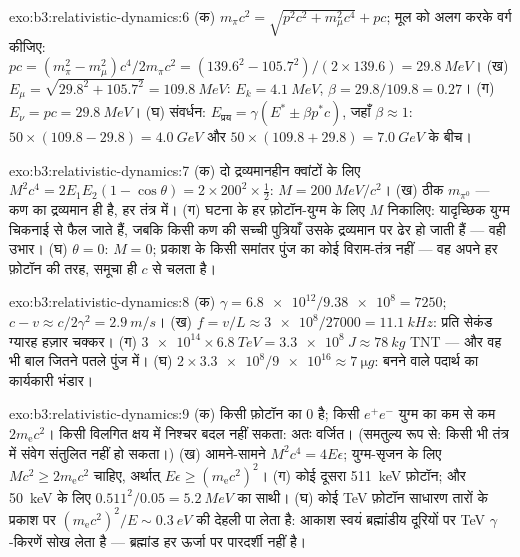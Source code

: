 \begin{solution}{exo:b3:relativistic-dynamics:6}
(क) $m_\pi c^2 = \sqrt{p^2c^2 + m_\mu^2c^4} + pc$; मूल को अलग करके
वर्ग कीजिए: $pc = (m_\pi^2 - m_\mu^2)c^4/2m_\pi c^2 =
(139.6^2 - 105.7^2)/(2 \times 139.6) = \qty{29.8}{MeV}$। (ख) $E_\mu =
\sqrt{29.8^2 + 105.7^2} = \qty{109.8}{MeV}$: $E_k = \qty{4.1}{MeV}$,
$\beta = 29.8/109.8 = 0.27$। (ग) $E_\nu = pc = \qty{29.8}{MeV}$। (घ)
संवर्धन: $E_{\text{प्रय}} = \gamma(E^* \pm \beta p^*c)$, जहाँ $\beta
\approx 1$: $50 \times (109.8 - 29.8) = \qty{4.0}{GeV}$ और
$50 \times (109.8 + 29.8) = \qty{7.0}{GeV}$ के बीच।
\end{solution}

\begin{solution}{exo:b3:relativistic-dynamics:7}
(क) दो द्रव्यमानहीन क्वांटों के लिए $M^2c^4 = 2E_1E_2(1 - \cos\theta) =
2 \times 200^2 \times \tfrac12$: $M = \qty{200}{MeV}/c^2$। (ख)
ठीक $m_{\pi^0}$ ---  कण का द्रव्यमान ही है, हर
तंत्र में। (ग) घटना के हर फ़ोटॉन-युग्म के लिए $M$ निकालिए:
यादृच्छिक युग्म चिकनाई से फैल जाते हैं, जबकि किसी कण की सच्ची पुत्रियाँ
उसके द्रव्यमान पर ढेर हो जाती हैं --- वही उभार। (घ) $\theta = 0$: $M = 0$;
प्रकाश के किसी समांतर पुंज का कोई विराम-तंत्र नहीं --- वह अपने हर
फ़ोटॉन की तरह, समूचा ही $c$ से चलता है।
\end{solution}

\begin{solution}{exo:b3:relativistic-dynamics:8}
(क) $\gamma = \num{6.8e12}/\num{9.38e8} = 7250$; $c - v \approx
c/2\gamma^2 = \qty{2.9}{m/s}$। (ख) $f = v/L \approx \num{3e8}/27000 =
\qty{11.1}{kHz}$: प्रति सेकंड ग्यारह हज़ार चक्कर। (ग) $\num{3e14}
\times \qty{6.8}{TeV} = \qty{3.3e8}{J} \approx \qty{78}{kg}$ TNT
--- और वह भी बाल जितने पतले पुंज में। (घ) $2 \times \num{3.3e8}/\num{9e16} \approx
\qty{7}{\micro g}$: बनने वाले पदार्थ का कार्यकारी भंडार।
\end{solution}

\begin{solution}{exo:b3:relativistic-dynamics:9}
(क) किसी फ़ोटॉन का  $0$ है; किसी $e^+e^-$ युग्म का कम
से कम $2m_{\text{e}}c^2$। किसी विलगित क्षय में निश्चर बदल नहीं सकता:
अतः वर्जित। (समतुल्य रूप से: किसी भी तंत्र में संवेग संतुलित नहीं हो
सकता।) (ख) आमने-सामने $M^2c^4 = 4E\epsilon$; युग्म-सृजन के लिए
$Mc^2 \ge
2m_{\text{e}}c^2$ चाहिए, अर्थात् $E\epsilon \ge (m_{\text{e}}c^2)^2$। (ग)
कोई दूसरा \qty{511}{keV} फ़ोटॉन; और \qty{50}{keV} के लिए
$0.511^2/0.05 = \qty{5.2}{MeV}$ का साथी। (घ) कोई TeV फ़ोटॉन साधारण
तारों के प्रकाश पर $(m_{\text{e}}c^2)^2/E \sim \qty{0.3}{eV}$ की
देहली पा लेता है: आकाश स्वयं ब्रह्मांडीय दूरियों पर TeV
$\gamma$-किरणें सोख लेता है --- ब्रह्मांड हर ऊर्जा पर पारदर्शी नहीं है।
\end{solution}

